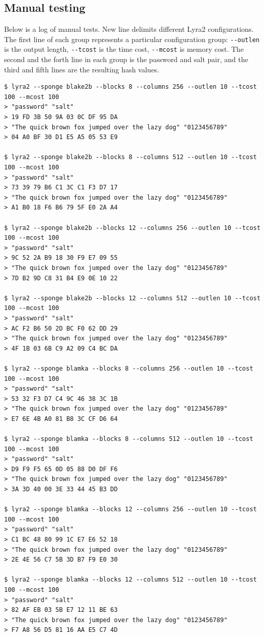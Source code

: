 \subsection{Manual testing}
\label{sec:manual-testing}

Below is a log of manual tests. New line delimits different Lyra2 configurations. The first line of each group represents a particular configuration group: \verb|--outlen| is the output length, \verb|--tcost| is the time cost, \verb|--mcost| is memory cost. The second and the forth line in each group is the password and salt pair, and the third and fifth lines are the resulting hash values.

\tiny
\begin{verbatim}
$ lyra2 --sponge blake2b --blocks 8 --columns 256 --outlen 10 --tcost 100 --mcost 100
> "password" "salt"
> 19 FD 3B 50 9A 03 0C DF 95 DA
> "The quick brown fox jumped over the lazy dog" "0123456789"
> 04 A0 BF 30 D1 E5 A5 05 53 E9

$ lyra2 --sponge blake2b --blocks 8 --columns 512 --outlen 10 --tcost 100 --mcost 100
> "password" "salt"
> 73 39 79 B6 C1 3C C1 F3 D7 17
> "The quick brown fox jumped over the lazy dog" "0123456789"
> A1 B0 18 F6 B6 79 5F E0 2A A4

$ lyra2 --sponge blake2b --blocks 12 --columns 256 --outlen 10 --tcost 100 --mcost 100
> "password" "salt"
> 9C 52 2A B9 18 30 F9 E7 09 55
> "The quick brown fox jumped over the lazy dog" "0123456789"
> 7D B2 9D C8 31 B4 E9 0E 10 22

$ lyra2 --sponge blake2b --blocks 12 --columns 512 --outlen 10 --tcost 100 --mcost 100
> "password" "salt"
> AC F2 B6 50 2D BC F0 62 DD 29
> "The quick brown fox jumped over the lazy dog" "0123456789"
> 4F 1B 03 6B C9 A2 09 C4 BC DA

$ lyra2 --sponge blamka --blocks 8 --columns 256 --outlen 10 --tcost 100 --mcost 100
> "password" "salt"
> 53 32 F3 D7 C4 9C 46 38 3C 1B
> "The quick brown fox jumped over the lazy dog" "0123456789"
> E7 6E 4B A0 81 B8 3C CF D6 64

$ lyra2 --sponge blamka --blocks 8 --columns 512 --outlen 10 --tcost 100 --mcost 100
> "password" "salt"
> D9 F9 F5 65 0D 05 88 D0 DF F6
> "The quick brown fox jumped over the lazy dog" "0123456789"
> 3A 3D 40 00 3E 33 44 45 B3 DD

$ lyra2 --sponge blamka --blocks 12 --columns 256 --outlen 10 --tcost 100 --mcost 100
> "password" "salt"
> C1 BC 48 80 99 1C E7 E6 52 18
> "The quick brown fox jumped over the lazy dog" "0123456789"
> 2E 4E 56 C7 5B 3D B7 F9 E0 30

$ lyra2 --sponge blamka --blocks 12 --columns 512 --outlen 10 --tcost 100 --mcost 100
> "password" "salt"
> 82 AF EB 03 5B E7 12 11 BE 63
> "The quick brown fox jumped over the lazy dog" "0123456789"
> F7 A8 56 D5 81 16 AA E5 C7 4D
\end{verbatim}
\normalsize

